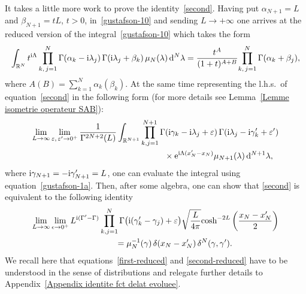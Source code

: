 It takes a little more work to prove the identity~\eqref{second}. Having put $\alpha_{N+1}=L$ and $\beta_{N+1}=t L$, $t>0$,
in~\eqref{gustafson-10} and sending $L\to +\infty$ one arrives at the reduced version of the integral~\eqref{gustafson-10} which takes the
form~\cite{DMspinchainandSL2RGustafson}
\begin{gather}\label{gustafson-1a}
\int_{\mathbb R^N} t^{{\rm i}\Lambda}
\prod_{k,\,j=1}^{N} \Gamma(\alpha_k-{\rm i}\lambda_j)\,\Gamma({\rm i}\lambda_j+\beta_k)\,
\mu_N(\lambda)\, {\rm d}^N\lambda
=\frac{t^{A}}{(1+t)^{A+B}}{\prod_{k,\,j=1}^{N}\Gamma(\alpha_k+\beta_j)},
\end{gather}
where $A(B)=\sum_{k=1}^N \alpha_k(\beta_k)$. At the same time representing the l.h.s.\ of equation~\eqref{second} in the following form (for
more details see Lemma~\ref{Lemme isometrie operateur SAB}):
\begin{gather*}
\lim_{L\rightarrow\infty} \lim_{\varepsilon,\,\varepsilon'\rightarrow 0^+} \frac1{\Gamma^{{2N+2}}(L)}\int_{\mathbb R^{N+1}}
\prod_{k,j=1}^{N+1} \Gamma({\rm i} \gamma_k-{\rm i}\lambda_j+\varepsilon)\,
\Gamma({\rm i}\lambda_j-{\rm i}\gamma'_k+\varepsilon')
\\ \hphantom{\lim_{L\rightarrow\infty} \lim_{\varepsilon,\,\varepsilon'\rightarrow 0^+} \frac1{\Gamma^{{2N+2}}(L)}\int_{\mathbb R^{N+1}}
\prod_{k,j=1}^{N+1}}
{}\times{\rm e}^{{\rm i}\Lambda(x'_N-x_N)}
\mu_{N+1}(\lambda) \,{\rm d}^{N+1}\lambda,
\end{gather*}
where ${\rm i}\gamma_{N+1}=-{\rm i}\gamma'_{N+1} =L$, one can evaluate the integral using equation~\eqref{gustafson-1a}. Then, after some algebra, one can
show that \eqref{second} is equivalent to the following identity
\begin{gather}
\lim_{L\rightarrow\infty} \lim_{\epsilon\rightarrow 0^+}
L^{{\rm i}(\Gamma'-\Gamma)}\prod_{k,j=1}^{N}\Gamma\big({\rm i}(\gamma'_k-\gamma_j)+\varepsilon\big)
\sqrt{\frac{L}{4\pi}}{\cosh^{-2L}\bigg(\frac{x_N-x'_N}2\bigg)}\nonumber
 \\ \hphantom{\lim_{L\rightarrow\infty} \lim_{\epsilon\rightarrow 0^+}}
{}= {\mu^{-1}_{N}(\gamma)}
\,\delta(x_N-x'_N)\,\delta^{N}(\gamma,\gamma').\label{second-reduced}
\end{gather}
We recall here that equations~\eqref{first-reduced} and \eqref{second-reduced} have to be understood in the sense of distributions and relegate
further details to Appendix~\ref{Appendix identite fct delat evoluee}.
